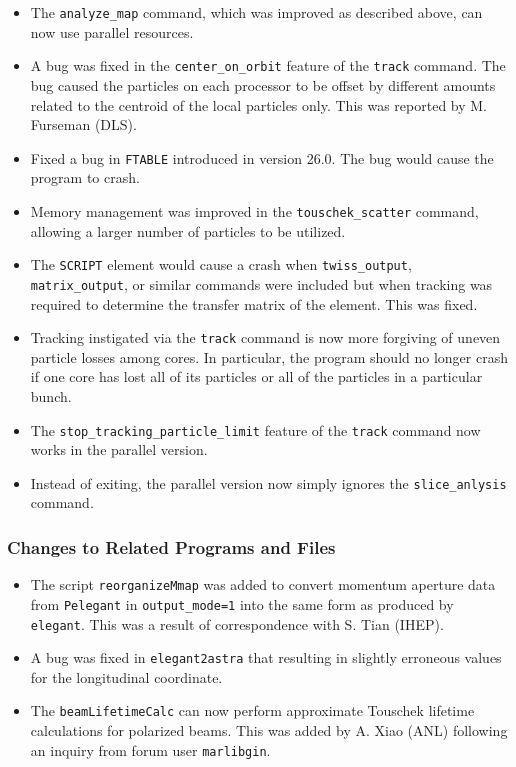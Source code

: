 \documentclass[11pt]{article}
\begin{document}
\begin{itemize}
\item The \verb|analyze_map| command, which was improved as described above, can now use parallel resources.
\item A bug was fixed in the \verb|center_on_orbit| feature of the \verb|track| command. The bug caused the
  particles on each processor to be offset by different amounts related to the centroid of the local particles
  only. This was reported by M. Furseman (DLS).
\item Fixed a bug in \verb|FTABLE| introduced in version 26.0. The bug would cause the program to crash.
\item Memory management was improved in the \verb|touschek_scatter| command, allowing a larger number of particles
  to be utilized.
\item The \verb|SCRIPT| element would cause a crash when \verb|twiss_output|, \verb|matrix_output|, or
  similar commands were included but when tracking was required to determine the transfer matrix of the element.
  This was fixed.
\item Tracking instigated via the \verb|track| command is now more forgiving of uneven particle losses among 
  cores. In particular, the program should no longer crash if one core has lost all of its particles or
  all of the particles in a particular bunch.
\item The \verb|stop_tracking_particle_limit| feature of the \verb|track| command now works in the parallel version.
\item Instead of exiting, the parallel version now simply ignores the \verb|slice_anlysis| command.
\end{itemize}

\subsubsection{Changes to Related Programs and Files}

\begin{itemize}
\item The script \verb|reorganizeMmap| was added to convert momentum aperture data from \verb|Pelegant| in \verb|output_mode=1| 
  into the same form as produced by \verb|elegant|. This was a result of correspondence with S. Tian (IHEP).
\item A bug was fixed in \verb|elegant2astra| that resulting in slightly erroneous values for the longitudinal coordinate.
\item The \verb|beamLifetimeCalc| can now perform approximate Touschek lifetime calculations for polarized beams.
  This was added by A. Xiao (ANL) following an inquiry from forum user \verb|marlibgin|.
\end{itemize}
\end{document}
